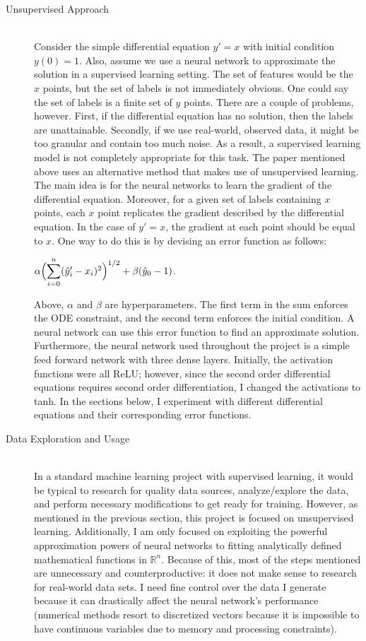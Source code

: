 \documentclass[12pt]{article}
\newcommand{\dsum}[2]{\mathlarger{\sum}_{#1}^{#2}}
\newcommand{\bgc}{\begin{center}}
\newcommand{\enc}{\end{center}}
\begin{document}
\begin{description}
    \item[Unsupervised Approach] \hfill \\
    Consider the simple differential equation $y' = x$ with initial condition
    $y(0) = 1$. Also, assume we use a neural network to approximate the
    solution in a supervised learning setting. The set of features would be the
    $x$ points, but the set of labels is not immediately obvious. One could say
    the set of labels is a finite set of $y$ points. There are a couple of
    problems, however. First, if the differential equation has no solution,
    then the labels are unattainable. Secondly, if we use real-world, observed
    data, it might be too granular and contain too much noise. As a result, a
    supervised learning model is not completely appropriate for this task. The
    paper mentioned above uses an alternative method that makes use of
    unsupervised learning. The main idea is for the neural networks to learn
    the gradient of the differential equation. Moreover, for a given set of
    labels containing $x$ points, each $x$ point replicates the gradient
    described by the differential equation. In the case of $y' = x$, the
    gradient at each point should be equal to $x$. One way to do this is by
    devising an error function as follows: 
    \bgc 
    $\alpha\Bigl(\dsum{i=0}{n}(\hat{y}_i' - x_i)^2\Bigr)^{1/2} + \beta(\hat{y}_0 - 1)$.
    \enc
    Above, $\alpha$ and $\beta$ are hyperparameters. The first term in the sum
    enforces the ODE constraint, and the second term enforces the initial
    condition. A neural network can use this error function to find an
    approximate solution. Furthermore, the neural network used throughout the
    project is a simple feed forward network with three dense layers.
    Initially, the activation functions were all ReLU; however, since the
    second order differential equations requires second order differentiation,
    I changed the activations to tanh. In the sections below, I experiment with
    different differential equations and their corresponding error functions. 

    \item[Data Exploration and Usage] \hfill \\
    In a standard machine learning project with supervised learning, it would
    be typical to research for quality data sources, analyze/explore the data,
    and perform necessary modifications to get ready for training. However, as
    mentioned in the previous section, this project is focused on unsupervised
    learning. Additionally, I am only focused on exploiting the powerful
    approximation powers of neural networks to fitting analytically defined
    mathematical functions in $\mathbb{R}^n$. Because of this, most of the
    steps mentioned are unnecessary and counterproductive: it does not make
    sense to research for real-world data sets. I need fine control over the
    data I generate because it can drastically affect the neural network's
    performance (numerical methods resort to discretized vectors because it is
    impossible to have continuous variables due to memory and processing
    constraints). 
    

\end{description}
\end{document}
